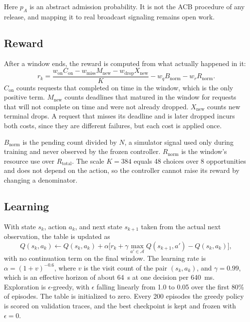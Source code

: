 \documentclass[conference]{IEEEtran}
\begin{document}
Here $p_A$ is an abstract admission probability. It is not the ACB procedure of any
release, and mapping it to real broadcast signaling remains open work.

\subsection{Reward}
After a window ends, the reward is computed from what actually happened in it:
\begin{equation}
r_k = \frac{w_{\mathrm{on}} C_{\mathrm{on}}
 - w_{\mathrm{miss}} M_{\mathrm{new}}
 - w_{\mathrm{drop}} X_{\mathrm{new}}}{K}
 - w_q B_{\mathrm{norm}} - w_r R_{\mathrm{norm}}.
\label{eq:reward}
\end{equation}
$C_{\mathrm{on}}$ counts requests that completed on time in the window, which is
the only positive term. $M_{\mathrm{new}}$ counts deadlines that matured in the window
for requests that will not complete on time and were not already dropped.
$X_{\mathrm{new}}$ counts new terminal drops. A request that misses its deadline and
is later dropped incurs both costs, since they are different failures, but each cost
is applied once.

$B_{\mathrm{norm}}$ is the pending count divided by $N$, a simulator signal used only
during training and never observed by the frozen controller. $R_{\mathrm{norm}}$ is
the window's resource use over $R_{\mathrm{total}}$. The scale $K = 384$ equals 48
choices over 8 opportunities and does not depend on the action, so the controller
cannot raise its reward by changing a denominator.

\subsection{Learning}
With state $s_k$, action $a_k$, and next state $s_{k+1}$ taken from the actual next
observation, the table is updated as
\begin{equation}
Q(s_k,a_k) \leftarrow Q(s_k,a_k) + \alpha
\big[ r_k + \gamma \max_{a' \in \mathcal{A}} Q(s_{k+1},a') - Q(s_k,a_k) \big],
\label{eq:qupdate}
\end{equation}
with no continuation term on the final window. The learning rate is
$\alpha = (1+v)^{-0.6}$, where $v$ is the visit count of the pair $(s_k,a_k)$, and
$\gamma = 0.99$, which is an effective horizon of about 64~s at one decision per
640~ms. Exploration is $\epsilon$-greedy, with $\epsilon$ falling linearly from 1.0 to
0.05 over the first 80\% of episodes. The table is initialized to zero. Every 200
episodes the greedy policy is scored on validation traces, and the best checkpoint
is kept and frozen with $\epsilon = 0$.
\end{document}
